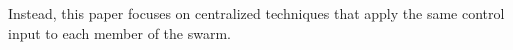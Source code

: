 Instead, this paper focuses on centralized techniques that apply the same control input to each member of the swarm.%


